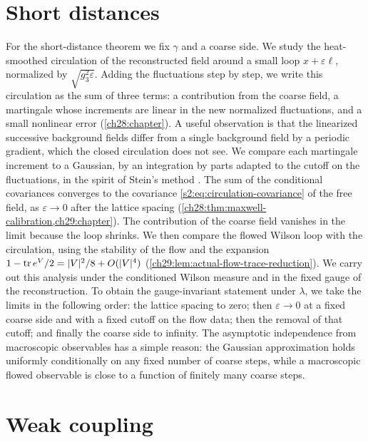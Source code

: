 \section{Short distances}\label{s3:short}

For the short-distance theorem we fix $\gamma$ and a coarse side. We study the heat-smoothed circulation of the reconstructed field around a small loop $x+\varepsilon\ell$, normalized by $\sqrt{g_3^2\varepsilon}$. Adding the fluctuations step by step, we write this circulation as the sum of three terms: a contribution from the coarse field, a martingale whose increments are linear in the new normalized fluctuations, and a small nonlinear error (\cref{ch28:chapter}). A useful observation is that the linearized successive background fields differ from a single background field by a periodic gradient, which the closed circulation does not see. We compare each martingale increment to a Gaussian, by an integration by parts adapted to the cutoff on the fluctuations, in the spirit of Stein's method \cite{Stein1972NormalApproximation}. The sum of the conditional covariances converges to the covariance \eqref{s2:eq:circulation-covariance} of the free field, as $\varepsilon\to0$ after the lattice spacing (\cref{ch28:thm:maxwell-calibration,ch29:chapter}). The contribution of the coarse field vanishes in the limit because the loop shrinks. We then compare the flowed Wilson loop with the circulation, using the stability of the flow and the expansion $1-\operatorname{tr} e^V/2=\lvert V\rvert^2/8+O(\lvert V\rvert^4)$ (\cref{ch29:lem:actual-flow-trace-reduction}). We carry out this analysis under the conditioned Wilson measure and in the fixed gauge of the reconstruction. To obtain the gauge-invariant statement under $\lambda$, we take the limits in the following order: the lattice spacing to zero; then $\varepsilon\to0$ at a fixed coarse side and with a fixed cutoff on the flow data; then the removal of that cutoff; and finally the coarse side to infinity. The asymptotic independence from macroscopic observables has a simple reason: the Gaussian approximation holds uniformly conditionally on any fixed number of coarse steps, while a macroscopic flowed observable is close to a function of finitely many coarse steps.

\section{Weak coupling}\label{s3:weak}


